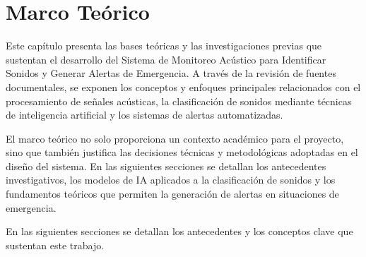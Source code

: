 \chapter{Marco Teórico}

Este capítulo presenta las bases teóricas y las investigaciones previas que sustentan el desarrollo del Sistema de Monitoreo Acústico para Identificar Sonidos y Generar Alertas de Emergencia. A través de la revisión de fuentes documentales, se exponen los conceptos y enfoques principales relacionados con el procesamiento de señales acústicas, la clasificación de sonidos mediante técnicas de inteligencia artificial y los sistemas de alertas automatizadas.

El marco teórico no solo proporciona un contexto académico para el proyecto, sino que también justifica las decisiones técnicas y metodológicas adoptadas en el diseño del sistema. En las siguientes secciones se detallan los antecedentes investigativos, los modelos de IA aplicados a la clasificación de sonidos y los fundamentos teóricos que permiten la generación de alertas en situaciones de emergencia.

En las siguientes secciones se detallan los antecedentes y los conceptos clave que sustentan este trabajo.







